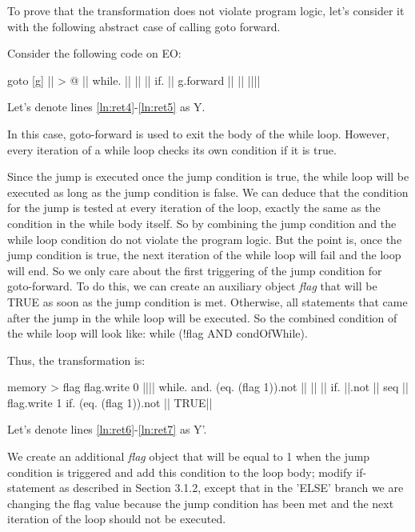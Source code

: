 \documentclass[sigplan,review,11pt,nonacm,natbib=false]{acmart}
\begin{document}
To prove that the transformation does not violate program logic, let's consider it with the following abstract case of calling goto forward.

Consider the following code on EO:

\begin{ffcode}
goto
  [g]
    || > @ |$\label{ln:ret4}$|
      while.
        ||
        ||
          ||
          if.
            ||
            g.forward ||
            ||
          |||$\label{ln:ret5}$|
\end{ffcode}

Let's denote lines \ref{ln:ret4}-\ref{ln:ret5} as Y.

In this case, goto-forward is used to exit the body of the while loop. However, every iteration of a while loop checks its own condition if it is true. 

Since the jump is executed once the jump condition is true, the while loop will be executed as long as the jump condition is false. We can deduce that the condition for the jump is tested at every iteration of the loop, exactly the same as the condition in the while body itself.
So by combining the jump condition and the while loop condition do not violate the program logic. But the point is, once the jump condition is true, the next iteration of the while loop will fail and the loop will end.
So we only care about the first triggering of the jump condition for goto-forward. To do this, we can create an auxiliary object \emph{flag} that will be TRUE as soon as the jump condition is met.
Otherwise, all statements that came after the jump in the while loop will be executed.
So the combined condition of the while loop will look like: while (!flag AND condOfWhile).

Thus, the transformation is:

\begin{ffcode}
memory > flag
flag.write 0
|||$\label{ln:ret6}$|
  while.
    and.
      (eq. (flag 1)).not
      ||
    ||
      ||
      if.
        ||.not
        ||
        seq
          ||
          flag.write 1
      if.
        (eq. (flag 1)).not
        ||
        TRUE|$\label{ln:ret7}$|
\end{ffcode}

Let's denote lines \ref{ln:ret6}-\ref{ln:ret7} as Y'.

We create an additional \emph{flag} object that will be equal to 1 when the jump condition is triggered and add this condition to the loop body; modify if-statement as described in Section 3.1.2, except that in the 'ELSE' branch we are changing the flag value because the jump condition has been met and the next iteration of the loop should not be executed.
\end{document}
